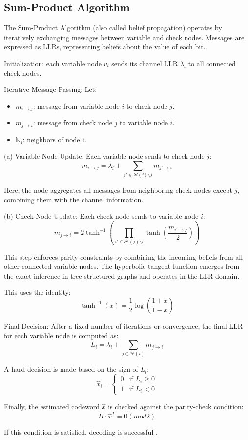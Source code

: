 \subsection{Sum-Product Algorithm}
The Sum-Product Algorithm (also called belief propagation) operates by iteratively exchanging messages between variable and check nodes.
Messages are expressed as LLRs, representing beliefs about the value of each bit.

Initialization:
each variable node $v_i$ sends its channel LLR $\lambda_i$ to all connected check nodes.

Iterative Message Passing:
Let:
\begin{itemize}
    \item $m_{i \to j}$: message from variable node $i$ to check node $j$.
    \item $m_{j \to i}$: message from check node $j$ to variable node $i$.
    \item $\mathbb{N}_j$: neighbors of node $i$.
\end{itemize}

(a) Variable Node Update:
Each variable node sends to check node $j$:
$$m_{i \to j} = \lambda_i + \sum_{j' \in \mathcal{N}(i) \setminus j} m_{j' \to i}$$

Here, the node aggregates all messages from neighboring check nodes except $j$, combining them with the channel information.

(b) Check Node Update:
Each check node sends to variable node $i$:
$$m_{j \to i} = 2 \tanh^{-1} \left( \prod_{i' \in \mathcal{N}(j) \setminus i} \tanh\left( \frac{m_{i' \to j}}{2} \right) \right)$$

This step enforces parity constraints by combining the incoming beliefs from all other connected variable nodes. 
The hyperbolic tangent function emerges from the exact inference in tree-structured graphs and operates in the LLR domain.

This uses the identity:
$$\tanh^{-1}(x) = \frac{1}{2} \log \left( \frac{1 + x}{1 - x} \right)$$

Final Decision:
After a fixed number of iterations or convergence, the final LLR for each variable node is computed as:
$$L_i = \lambda_i + \sum_{j \in \mathcal{N}(i)} m_{j \to i}$$

A hard decision is made based on the sign of $L_i$:
$$
\hat{x}_i =
\begin{cases}
0 & \text{if } L_i \geq 0 \\
1 & \text{if } L_i < 0
\end{cases}
$$

Finally, the estimated codeword $\hat{x}$ is checked against the parity-check condition:
$$H \cdot \hat{x}^T = 0 (mod 2)$$

If this condition is satisfied, decoding is successful \cite{910572}.